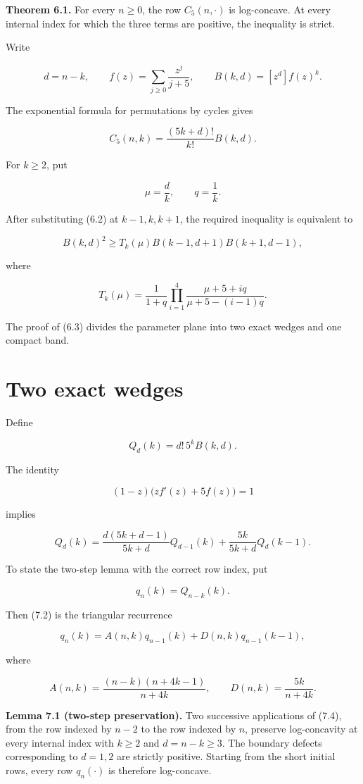 \documentclass[11pt]{article}
\numberwithin{equation}{section}
\begin{document}
\textbf{Theorem 6.1.} For every $n\ge0$, the row $C_5(n,\cdot)$ is log-concave. At every
internal index for which the three terms are positive, the inequality is strict.

Write

\[
d=n-k,
\qquad
f(z)=\sum_{j\ge0}\frac{z^j}{j+5},
\qquad
B(k,d)=[z^d]f(z)^k.
\tag{6.1}
\]

The exponential formula for permutations by cycles gives

\[
C_5(n,k)=\frac{(5k+d)!}{k!}B(k,d).
\tag{6.2}
\]

For $k\ge2$, put

\[
\mu=\frac{d}{k},\qquad q=\frac1k.
\]

After substituting (6.2) at $k-1,k,k+1$, the required inequality is equivalent to

\[
B(k,d)^2\ge T_k(\mu)B(k-1,d+1)B(k+1,d-1),
\tag{6.3}
\]

where

\[
T_k(\mu)=\frac{1}{1+q}
\prod_{i=1}^{4}
\frac{\mu+5+iq}{\mu+5-(i-1)q}.
\tag{6.4}
\]

The proof of (6.3) divides the parameter plane into two exact wedges and one compact band.

\section{Two exact wedges}


Define

\[
Q_d(k)=d!\,5^kB(k,d).
\tag{7.1}
\]

The identity

\[
(1-z)\bigl(zf'(z)+5f(z)\bigr)=1
\]

implies

\[
Q_d(k)=
\frac{d(5k+d-1)}{5k+d}Q_{d-1}(k)
+\frac{5k}{5k+d}Q_d(k-1).
\tag{7.2}
\]

To state the two-step lemma with the correct row index, put

\[
q_n(k)=Q_{n-k}(k).
\tag{7.3}
\]

Then (7.2) is the triangular recurrence

\[
q_n(k)=A(n,k)q_{n-1}(k)+D(n,k)q_{n-1}(k-1),
\tag{7.4}
\]

where

\[
A(n,k)=\frac{(n-k)(n+4k-1)}{n+4k},
\qquad
D(n,k)=\frac{5k}{n+4k}.
\tag{7.5}
\]

\textbf{Lemma 7.1 (two-step preservation).} Two successive applications of (7.4), from the
row indexed by $n-2$ to the row indexed by $n$, preserve
log-concavity at every internal index with $k\ge2$ and $d=n-k\ge3$. The boundary
defects corresponding to $d=1,2$ are strictly positive. Starting from the short initial
rows, every row $q_n(\cdot)$ is therefore log-concave.
\end{document}
